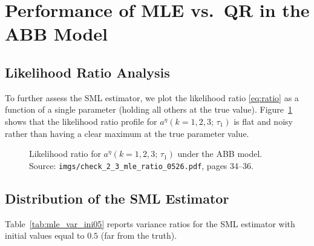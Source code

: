 \documentclass[12pt]{article}
\begin{document}
\section{Performance of MLE vs.\ QR in the ABB Model}
\label{sec:mle_abb}

\subsection{Likelihood Ratio Analysis}

To further assess the SML estimator, we plot the likelihood ratio
\eqref{eq:ratio} as a function of a single parameter (holding all others at
the true value).
Figure~\ref{fig:lik_ratio} shows that the likelihood ratio profile for
$a^\eta(k=1,2,3;\,\tau_1)$ is flat and noisy rather than having a clear
maximum at the true parameter value.

\begin{figure}[H]
\centering
\caption{Likelihood ratio for $a^\eta(k=1,2,3;\,\tau_1)$ under the ABB model.
Source: \texttt{imgs/check\_2\_3\_mle\_ratio\_0526.pdf}, pages 34--36.}
\label{fig:lik_ratio}
\end{figure}

\subsection{Distribution of the SML Estimator}

Table~\ref{tab:mle_var_ini05} reports variance ratios for the SML estimator
with initial values equal to $0.5$ (far from the truth).
\end{document}
